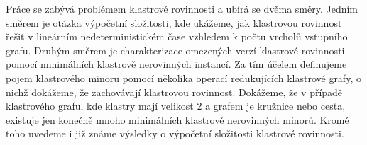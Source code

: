 \documentclass[12pt,a4report]{report}
\begin{document}
\author{Filip Šedivý}

Práce se zabývá problémem klastrové rovinnosti a ubírá se dvěma směry. Jedním směrem je otázka výpočetní složitosti, kde ukážeme, jak klastrovou rovinnost řešit v lineárním nedeterministickém čase vzhledem k počtu vrcholů vstupního grafu. Druhým směrem je charakterizace omezených verzí klastrové rovinnosti pomocí minimálních klastrově nerovinných instancí. Za tím účelem definujeme pojem klastrového minoru pomocí několika operací redukujících klastrové grafy, o nichž dokážeme, že zachovávají klastrovou rovinnost. Dokážeme, že v případě klastrového grafu, kde klastry mají velikost 2 a grafem je kružnice nebo cesta, existuje jen konečně mnoho minimálních klastrově nerovinných minorů. Kromě toho uvedeme i již známe výsledky o výpočetní složitosti klastrové rovinnosti.
\end{document}
